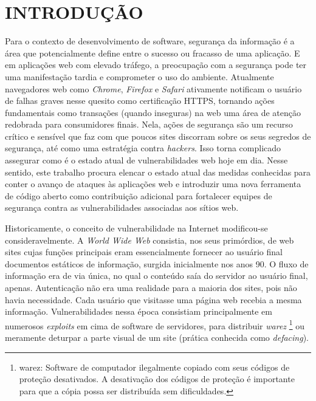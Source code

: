 \chapter{INTRODUÇÃO}

Para o contexto de desenvolvimento de software, segurança da informação é a área que potencialmente define entre o sucesso ou fracasso de uma aplicação. E em aplicações web com elevado tráfego, a preocupação com a segurança pode ter uma manifestação tardia e comprometer o uso do ambiente. Atualmente navegadores web como \textit{Chrome}, \textit{Firefox} e \textit{Safari} ativamente notificam o usuário de falhas graves nesse quesito como certificação HTTPS, tornando ações fundamentais como transações (quando inseguras) na web uma área de atenção redobrada para consumidores finais. Nela, ações de segurança são um recurso crítico e sensível que faz com que poucos sites discorram sobre os seus segredos de segurança, até como uma estratégia contra \textit{hackers}. Isso torna complicado assegurar como é o estado atual de vulnerabilidades web hoje em dia. Nesse sentido, este trabalho procura elencar o estado atual das medidas conhecidas para conter o avanço de ataques às aplicações web e introduzir uma nova ferramenta de código aberto como contribuição adicional para fortalecer equipes de segurança contra as vulnerabilidades associadas aos sítios web. 

Historicamente, o conceito de vulnerabilidade na Internet modificou-se consideravelmente. A \textit{World Wide Web} consistia, nos seus primórdios, de web sites cujas funções principais eram essencialmente fornecer ao usuário final documentos estáticos de informação, surgida inicialmente nos anos 90. O fluxo de informação era de via única, no qual o conteúdo saía do servidor ao usuário final, apenas. Autenticação não era uma realidade para a maioria dos sites, pois não havia necessidade. Cada usuário que visitasse uma página web recebia a mesma informação. \cite{stuttard_web_nodate} Vulnerabilidades nessa época consistiam principalmente em numerosos \textit{exploits} em cima de software de servidores, para distribuir \textit{warez} \footnote{warez: Software de computador ilegalmente copiado com seus códigos de proteção desativados. A desativação dos códigos de proteção é importante para que a cópia possa ser distribuída sem dificuldades.} ou meramente deturpar a parte visual de um site (prática conhecida como \textit{defacing}).

